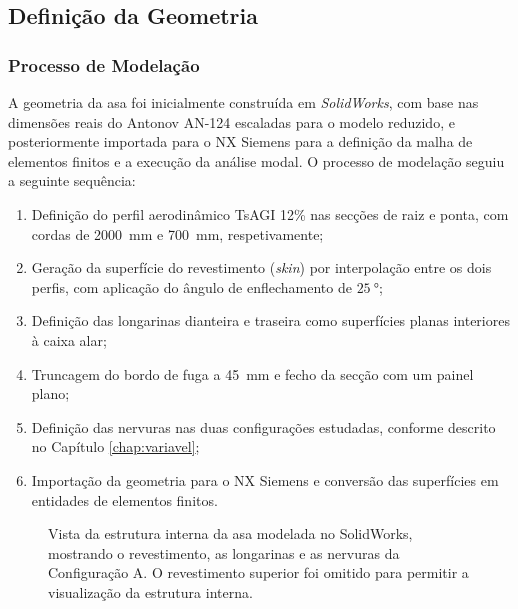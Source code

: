 \documentclass[a4paper,fleqn]{cas-sc}
\begin{document}
\subsection{Definição da Geometria}

\subsubsection{Processo de Modelação}

A geometria da asa foi inicialmente construída em \textit{SolidWorks}, com base nas dimensões reais do Antonov AN-124 escaladas para o modelo reduzido, e posteriormente importada para o NX Siemens para a definição da malha de elementos finitos e a execução da análise modal. O processo de modelação seguiu a seguinte sequência:

\begin{enumerate}
    \item Definição do perfil aerodinâmico TsAGI 12\% nas secções de raiz e ponta, com cordas de \SI{2000}{\milli\meter} e \SI{700}{\milli\meter}, respetivamente;
    \item Geração da superfície do revestimento (\textit{skin}) por interpolação entre os dois perfis, com aplicação do ângulo de enflechamento de $\qty{25}{\degree}$;
    \item Definição das longarinas dianteira e traseira como superfícies planas interiores à caixa alar;
    \item Truncagem do bordo de fuga a \SI{45}{\milli\meter} e fecho da secção com um painel plano;
    \item Definição das nervuras nas duas configurações estudadas, conforme descrito no Capítulo \ref{chap:variavel};
    \item Importação da geometria para o NX Siemens e conversão das superfícies em entidades de elementos finitos.
\end{enumerate}

\begin{figure}
    \centering
    \caption{Vista da estrutura interna da asa modelada no SolidWorks, mostrando o revestimento, as longarinas e as nervuras da Configuração A. O revestimento superior foi omitido para permitir a visualização da estrutura interna.}
    \label{fig:asa_sw}
\end{figure}
\end{document}

